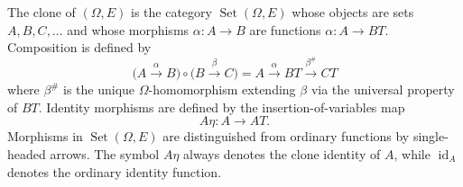The clone of $(\Omega, E)$ is the category $\operatorname{Set}(\Omega, E)$ whose objects are sets $A, B, C, \ldots$ and whose morphisms $\alpha: A \longrightarrow B$ are functions $\alpha: A \longrightarrow BT$. Composition is defined by
$$
\bigl( A \xrightarrow{\alpha} B \bigr) \circ \bigl( B \xrightarrow{\beta} C \bigr) = A \xrightarrow{\alpha} BT \xrightarrow{\beta^{\#}} CT
\tag{2.8}
$$
where $\beta^{\#}$ is the unique $\Omega$-homomorphism extending $\beta$ via the universal property of $BT$. Identity morphisms are defined by the insertion-of-variables map
$$
A\eta: A \longrightarrow AT.
\tag{2.9}
$$
Morphisms in $\operatorname{Set}(\Omega, E)$ are distinguished from ordinary functions by single-headed arrows. The symbol $A\eta$ always denotes the clone identity of $A$, while $\operatorname{id}_A$ denotes the ordinary identity function.
